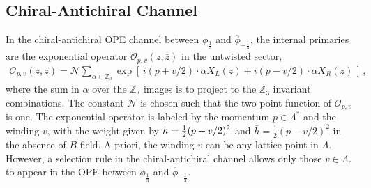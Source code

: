 \documentclass[12pt]{article}
\begin{document}
\subsection{Chiral-Antichiral Channel}




In the chiral-antichiral OPE channel between $\phi_{\frac13}$ and $\overline\phi_{-\frac13}$, the internal primaries are the exponential operator $\mathcal{O}_{p,v}(z,\bar z)$ in the untwisted sector,
\begin{align}\label{exp}
\mathcal{O}_{p,v}(z,\bar z)=\mathcal{N}\sum_{\alpha \in \mathbb{Z}_3 }  \exp\left[\, i( p+v/2) \cdot \alpha X_L (z)+ i (p-v/2)\cdot \alpha X_R(\bar z) \,\right] \,,
\end{align}
where the sum in $\alpha$ over the $\mathbb{Z}_3$ images is to project to the $\mathbb{Z}_3$ invariant combinations. The constant $\mathcal{N}$ is chosen such that the two-point function of $\mathcal{O}_{p,v}$ is one.  The exponential operator is labeled by the momentum $p\in \Lambda^*$ and the winding $v$, with the weight given by $h={1\over 2} (p+v/2)^2$ and $\bar h = \frac12(p-v/2)^2$ in the absence of $B$-field.  A priori, the winding $v$  can be any lattice point in $\Lambda$.  However, a selection rule \cite{Dixon:1986qv} in the chiral-antichiral channel allows only those $v\in \Lambda_c$ to appear in the OPE between $\phi_{\frac13}$ and $\overline\phi_{-\frac13}$.
\end{document}

